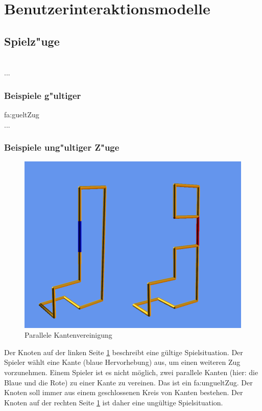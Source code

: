 	
\clearpage


\section{Benutzerinteraktionsmodelle}
	
\clearpage

\subsection{Spielz{"u}ge}

~\\
...

\subsubsection{Beispiele g{"u}ltiger}


\gls{fa:gueltZug}
~\\
...

\subsubsection{Beispiele ung{"u}ltiger Z{"u}ge}

	\begin{figure}[htb]
	  \centering
	  \includegraphics[width = \textwidth]{Inhalt/Nutzung/Grafiken/Grafische_Oberflaechen/Ungueltiger_Zug.png}
	  \caption{Parallele Kantenvereinigung}
	  \label{fig:zug1}
	\end{figure}

Der Knoten auf der linken Seite \ref{fig:zug1} beschreibt eine gültige Spielsituation. Der Spieler wählt eine Kante (blaue Hervorhebung) aus, um einen weiteren Zug vorzunehmen.
Einem Spieler ist es nicht möglich, zwei parallele Kanten (hier: die Blaue und die Rote) zu einer Kante zu vereinen. Das ist ein \gls{fa:ungueltZug}. Der Knoten soll immer aus einem geschlossenen Kreis von Kanten bestehen. Der Knoten auf der rechten Seite \ref{fig:zug1} ist daher eine ungültige Spielsituation.


